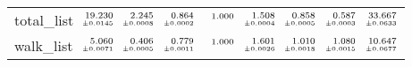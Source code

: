 \documentclass[a4paper,UKenglish]{lipics-v2016}
\begin{document}
\begin{table*}[t]
\begin{adjustbox}{width=1.2\textwidth,center}
\begin{tabular}{lrrrrrrrr}
\addlinespace
total\_list&$\substack{\mathmakebox[.7cm][r]{19.230}\\{\mathmakebox[.7cm][r]{\scriptscriptstyle \pm 0.0145}}}$&$\substack{\mathmakebox[.7cm][r]{2.245}\\{\mathmakebox[.7cm][r]{\scriptscriptstyle \pm 0.0008}}}$&$\substack{\mathmakebox[.7cm][r]{0.864}\\{\mathmakebox[.7cm][r]{\scriptscriptstyle \pm 0.0002}}}$&$\substack{\mathmakebox[.7cm][r]{1.000}\\{\mathmakebox[.7cm][r]{\scriptscriptstyle }}}$&$\substack{\mathmakebox[.7cm][r]{1.508}\\{\mathmakebox[.7cm][r]{\scriptscriptstyle \pm 0.0004}}}$&$\substack{\mathmakebox[.7cm][r]{0.858}\\{\mathmakebox[.7cm][r]{\scriptscriptstyle \pm 0.0005}}}$&$\substack{\mathmakebox[.7cm][r]{0.587}\\{\mathmakebox[.7cm][r]{\scriptscriptstyle \pm 0.0003}}}$&$\substack{\mathmakebox[.7cm][r]{33.667}\\{\mathmakebox[.7cm][r]{\scriptscriptstyle \pm 0.0633}}}$\\
\addlinespace
walk\_list&$\substack{\mathmakebox[.7cm][r]{5.060}\\{\mathmakebox[.7cm][r]{\scriptscriptstyle \pm 0.0071}}}$&$\substack{\mathmakebox[.7cm][r]{0.406}\\{\mathmakebox[.7cm][r]{\scriptscriptstyle \pm 0.0005}}}$&$\substack{\mathmakebox[.7cm][r]{0.779}\\{\mathmakebox[.7cm][r]{\scriptscriptstyle \pm 0.0011}}}$&$\substack{\mathmakebox[.7cm][r]{1.000}\\{\mathmakebox[.7cm][r]{\scriptscriptstyle }}}$&$\substack{\mathmakebox[.7cm][r]{1.601}\\{\mathmakebox[.7cm][r]{\scriptscriptstyle \pm 0.0026}}}$&$\substack{\mathmakebox[.7cm][r]{1.010}\\{\mathmakebox[.7cm][r]{\scriptscriptstyle \pm 0.0018}}}$&$\substack{\mathmakebox[.7cm][r]{1.080}\\{\mathmakebox[.7cm][r]{\scriptscriptstyle \pm 0.0015}}}$&$\substack{\mathmakebox[.7cm][r]{10.647}\\{\mathmakebox[.7cm][r]{\scriptscriptstyle \pm 0.0677}}}$\\
\midrule

\end{tabular}
\end{adjustbox}
\end{table*}
\end{document}
